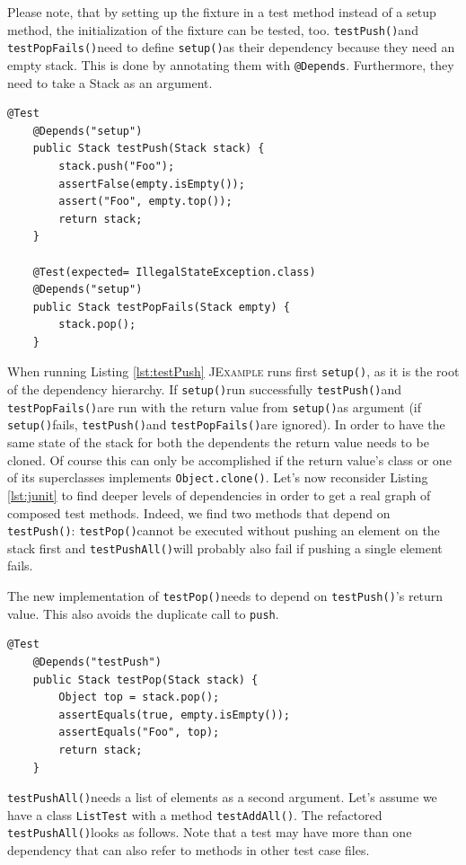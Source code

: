 \documentclass[11pt]{article}
\newcommand{\JExample}{\textsc{JExample}\xspace}
\newcommand{\ttt}[1]{\texttt{#1}}
\newcommand{\setup}{\ttt{setup()}}
\newcommand{\testPush}{\ttt{testPush()}}
\newcommand{\testPushAll}{\ttt{testPushAll()}}
\newcommand{\testPop}{\ttt{testPop()}}
\newcommand{\testPopFails}{\ttt{testPopFails()}}
\begin{document}
Please note, that by setting up the fixture in a test method instead of a setup method, the initialization of the fixture can be tested, too.
\testPush and \testPopFails need to define \setup as their dependency because they need an empty stack. This is done by annotating them with \ttt{@Depends}. Furthermore, they need to take a Stack as an argument.

\begin{lstlisting}[label=lst:testpush,caption=Take another test's result as input value.]
    @Test
    @Depends("setup")
    public Stack testPush(Stack stack) {
        stack.push("Foo");
        assertFalse(empty.isEmpty());
        assert("Foo", empty.top());
        return stack;
    }

    @Test(expected= IllegalStateException.class)
    @Depends("setup")
    public Stack testPopFails(Stack empty) {
        stack.pop();
    }
\end{lstlisting}

When running Listing \ref{lst:testPush} \JExample runs first \setup, as it is the root of the dependency hierarchy. If \setup run successfully \testPush and \testPopFails are run with the return value from \setup as argument (if \setup fails, \testPush and \testPopFails are ignored).
In order to have the same state of the stack for both the dependents the return value needs to be cloned. Of course this can only be accomplished if the return value's class or one of its superclasses implements \verb|Object.clone()|.
Let's now reconsider Listing \ref{lst:junit} to find deeper levels of dependencies in order to get a real graph of composed test methods.
Indeed, we find two methods that depend on \testPush: \testPop cannot be executed without pushing an element on the stack first and \testPushAll will probably also fail if pushing a single element fails.

The new implementation of \testPop needs to depend on \testPush's return value. This also avoids the duplicate call to \ttt{push}.

\begin{lstlisting}[label=lst:testpop,caption=Avoid code duplication using dependencies.]
    @Test
    @Depends("testPush")
    public Stack testPop(Stack stack) {
        Object top = stack.pop();
        assertEquals(true, empty.isEmpty());
        assertEquals("Foo", top);
        return stack;
    }
\end{lstlisting}

\testPushAll needs a list of elements as a second argument. Let's assume we have a class \ttt{ListTest} with a method \ttt{testAddAll()}. The refactored \testPushAll looks as follows. Note that a test may have more than one dependency that can also refer to methods in other test case files.
\end{document}
